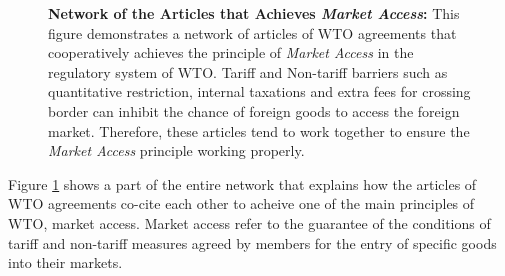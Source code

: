 
\begin{figure}
    \centering{
        
    }
    \caption{{\bf Network of the Articles that Achieves \textit{Market Access}:}
        This figure demonstrates a network of articles of WTO agreements
        that cooperatively achieves the principle of \textit{Market Access} in the regulatory system of WTO.
        Tariff and Non-tariff barriers such as quantitative restriction, internal taxations
        and extra fees for crossing border can inhibit the chance of foreign goods to access the foreign market.
        Therefore, these articles tend to work together to ensure the \textit{Market Access} principle working properly.
    }
    \label{fig:market-aceess_directed}
\end{figure}

Figure \ref{fig:market-aceess_directed} shows a part of the entire network that explains how
the articles of WTO agreements co-cite each other to acheive one of the main principles of 
WTO, market access. Market access 
refer to the guarantee of the conditions of
tariff and non-tariff measures 
agreed by members for the entry of specific 
goods into their markets.
